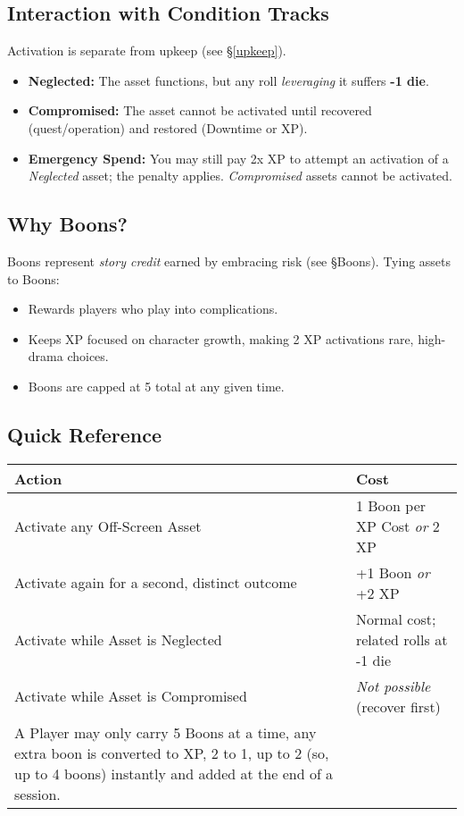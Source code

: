 \documentclass[12pt]{book}
\begin{document}
\subsection*{Interaction with Condition Tracks}
Activation is separate from upkeep (see \S\ref{upkeep}).
\begin{itemize}
  \item \textbf{Neglected:} The asset functions, but any roll \emph{leveraging} it suffers \textbf{-1 die}.
  \item \textbf{Compromised:} The asset cannot be activated until recovered (quest/operation) and restored (Downtime or XP).
  \item \textbf{Emergency Spend:} You may still pay 2x XP to attempt an activation of a \emph{Neglected} asset; the penalty applies. \emph{Compromised} assets cannot be activated.
\end{itemize}

\subsection*{Why Boons?}
Boons represent \emph{story credit} earned by embracing risk (see \S Boons). Tying assets to Boons:
\begin{itemize}
  \item Rewards players who play into complications.
  \item Keeps XP focused on character growth, making 2 XP activations rare, high-drama choices.
  \item Boons are capped at 5 total at any given time.
\end{itemize}

\subsection*{Quick Reference}
\begin{center}
\begin{tabular}{ll}
\toprule
\textbf{Action} & \textbf{Cost} \\
\midrule
Activate any Off-Screen Asset & 1 Boon per XP Cost \emph{or} 2 XP \\
Activate again for a second, distinct outcome & +1 Boon \emph{or} +2 XP \\
Activate while Asset is Neglected & Normal cost; related rolls at -1 die \\
Activate while Asset is Compromised & \textit{Not possible} (recover first) \\
A Player may only carry 5 Boons at a time, any extra boon is converted to XP, 2 to 1, up to 2 (so, up to 4 boons) instantly and added at the end of a session.
\bottomrule
\end{tabular}
\end{center}
\end{document}
